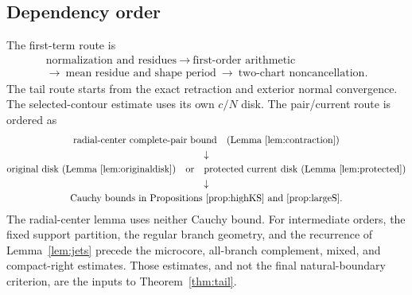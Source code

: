 \documentclass[11pt]{article}
\numberwithin{equation}{section}
\theoremstyle{definition}
\begin{document}
\subsection{Dependency order}
The first-term route is
\[
 \begin{gathered}
 \text{normalization and residues}
 \ \longrightarrow\ \text{first-order arithmetic}\\
 \longrightarrow\ \text{mean residue and shape period}
 \ \longrightarrow\ \text{two-chart noncancellation}.
 \end{gathered}
\]
The tail route starts from the exact retraction and exterior normal
convergence. The selected-contour estimate uses its own \(c/N\)
disk. The pair/current route is ordered as
\[
 \begin{gathered}
 \text{radial-center complete-pair bound}
       \quad\text{(Lemma~\ref{lem:contraction})}\\
 \downarrow\\
 \text{original disk (Lemma~\ref{lem:originaldisk})}
 \quad\text{or}\quad
 \text{protected current disk (Lemma~\ref{lem:protected})}\\
 \downarrow\\
 \text{Cauchy bounds in Propositions~\ref{prop:highKS}
       and \ref{prop:largeS}.}
 \end{gathered}
\]
The radial-center lemma uses neither Cauchy bound.
For intermediate orders, the fixed support partition, the regular
branch geometry, and the recurrence of Lemma~\ref{lem:jets} precede
the microcore, all-branch complement, mixed, and compact-right
estimates. Those estimates, and not the final natural-boundary
criterion, are the inputs to Theorem~\ref{thm:tail}.
\end{document}
